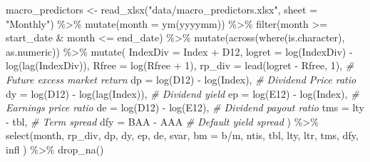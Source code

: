\documentclass[
]{krantz}
\newenvironment{Shaded}{\begin{snugshade}}{\end{snugshade}}
\newcommand{\AttributeTok}[1]{\textcolor[rgb]{0.61,0.61,0.61}{#1}}
\newcommand{\CommentTok}[1]{\textcolor[rgb]{0.37,0.37,0.37}{\textit{#1}}}
\newcommand{\DecValTok}[1]{\textcolor[rgb]{0.06,0.06,0.06}{#1}}
\newcommand{\FunctionTok}[1]{\textcolor[rgb]{0,0,0}{#1}}
\newcommand{\NormalTok}[1]{#1}
\newcommand{\OtherTok}[1]{\textcolor[rgb]{0.37,0.37,0.37}{#1}}
\newcommand{\SpecialCharTok}[1]{\textcolor[rgb]{0,0,0}{#1}}
\newcommand{\StringTok}[1]{\textcolor[rgb]{0.5,0.5,0.5}{#1}}
\begin{document}
\begin{Shaded}
\begin{Highlighting}[]
\NormalTok{macro\_predictors }\OtherTok{\textless{}{-}} \FunctionTok{read\_xlsx}\NormalTok{(}\StringTok{"data/macro\_predictors.xlsx"}\NormalTok{, }
                              \AttributeTok{sheet =} \StringTok{"Monthly"}\NormalTok{) }\SpecialCharTok{\%\textgreater{}\%}
  \FunctionTok{mutate}\NormalTok{(}\AttributeTok{month =} \FunctionTok{ym}\NormalTok{(yyyymm)) }\SpecialCharTok{\%\textgreater{}\%}
  \FunctionTok{filter}\NormalTok{(month }\SpecialCharTok{\textgreater{}=}\NormalTok{ start\_date }\SpecialCharTok{\&}\NormalTok{ month }\SpecialCharTok{\textless{}=}\NormalTok{ end\_date) }\SpecialCharTok{\%\textgreater{}\%}
  \FunctionTok{mutate}\NormalTok{(}\FunctionTok{across}\NormalTok{(}\FunctionTok{where}\NormalTok{(is.character), as.numeric)) }\SpecialCharTok{\%\textgreater{}\%}
  \FunctionTok{mutate}\NormalTok{(}
    \AttributeTok{IndexDiv =}\NormalTok{ Index }\SpecialCharTok{+}\NormalTok{ D12,}
    \AttributeTok{logret =} \FunctionTok{log}\NormalTok{(IndexDiv) }\SpecialCharTok{{-}} \FunctionTok{log}\NormalTok{(}\FunctionTok{lag}\NormalTok{(IndexDiv)),}
    \AttributeTok{Rfree =} \FunctionTok{log}\NormalTok{(Rfree }\SpecialCharTok{+} \DecValTok{1}\NormalTok{),}
    \AttributeTok{rp\_div =} \FunctionTok{lead}\NormalTok{(logret }\SpecialCharTok{{-}}\NormalTok{ Rfree, }\DecValTok{1}\NormalTok{), }\CommentTok{\# Future excess market return}
    \AttributeTok{dp =} \FunctionTok{log}\NormalTok{(D12) }\SpecialCharTok{{-}} \FunctionTok{log}\NormalTok{(Index), }\CommentTok{\# Dividend Price ratio}
    \AttributeTok{dy =} \FunctionTok{log}\NormalTok{(D12) }\SpecialCharTok{{-}} \FunctionTok{log}\NormalTok{(}\FunctionTok{lag}\NormalTok{(Index)), }\CommentTok{\# Dividend yield}
    \AttributeTok{ep =} \FunctionTok{log}\NormalTok{(E12) }\SpecialCharTok{{-}} \FunctionTok{log}\NormalTok{(Index), }\CommentTok{\# Earnings price ratio}
    \AttributeTok{de =} \FunctionTok{log}\NormalTok{(D12) }\SpecialCharTok{{-}} \FunctionTok{log}\NormalTok{(E12), }\CommentTok{\# Dividend payout ratio}
    \AttributeTok{tms =}\NormalTok{ lty }\SpecialCharTok{{-}}\NormalTok{ tbl, }\CommentTok{\# Term spread}
    \AttributeTok{dfy =}\NormalTok{ BAA }\SpecialCharTok{{-}}\NormalTok{ AAA }\CommentTok{\# Default yield spread}
\NormalTok{  ) }\SpecialCharTok{\%\textgreater{}\%}
  \FunctionTok{select}\NormalTok{(month, rp\_div, dp, dy, ep, de, svar,}
    \AttributeTok{bm =} \StringTok{\textasciigrave{}}\AttributeTok{b/m}\StringTok{\textasciigrave{}}\NormalTok{, ntis, tbl, lty, ltr,}
\NormalTok{    tms, dfy, infl}
\NormalTok{  ) }\SpecialCharTok{\%\textgreater{}\%}
  \FunctionTok{drop\_na}\NormalTok{()}
\end{Highlighting}
\end{Shaded}
\end{document}

